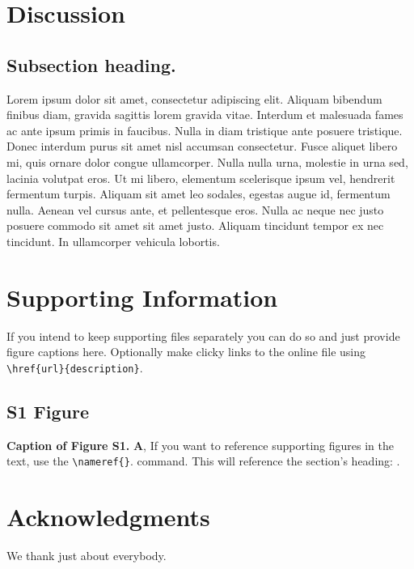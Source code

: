 \documentclass[10pt,letterpaper]{article}
\begin{document}

\section*{Discussion}
\subsection*{Subsection heading.}

Lorem ipsum dolor sit amet, consectetur adipiscing elit. Aliquam bibendum finibus diam, gravida sagittis lorem gravida vitae. Interdum et malesuada fames ac ante ipsum primis in faucibus. Nulla in diam tristique ante posuere tristique. Donec interdum purus sit amet nisl accumsan consectetur. Fusce aliquet libero mi, quis ornare dolor congue ullamcorper. Nulla nulla urna, molestie in urna sed, lacinia volutpat eros. Ut mi libero, elementum scelerisque ipsum vel, hendrerit fermentum turpis. Aliquam sit amet leo sodales, egestas augue id, fermentum nulla. Aenean vel cursus ante, et pellentesque eros. Nulla ac neque nec justo posuere commodo sit amet sit amet justo. Aliquam tincidunt tempor ex nec tincidunt. In ullamcorper vehicula lobortis. 


\section*{Supporting Information}
If you intend to keep supporting files separately you can do so and just provide figure captions here. Optionally make clicky links to the online file using \verb!\href{url}{description}!.

\setcounter{figure}{0}
\renewcommand{\thefigure}{S\arabic{figure}}

\subsection*{S1 Figure}
\label{example_label}
{\bf Caption of Figure S1.} \textbf{A}, If you want to reference supporting figures in the text, use the \verb!\nameref{}!. command. This will reference the section's heading: .


\section*{Acknowledgments}
We thank just about everybody.

\nolinenumbers




\end{document}
